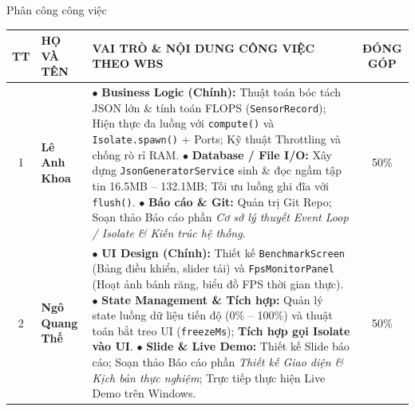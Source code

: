\documentclass[aspectratio=169, 10pt]{beamer}
\begin{document}
\begin{frame}{Phân công công việc}
  \vspace{-0.2cm}
  \centering
  \footnotesize
  \setlength{\tabcolsep}{4pt}
  \renewcommand{\arraystretch}{1.15}
  \begin{tabular}{|c|p{2.3cm}|p{8.5cm}|c|}
    \hline
    \rowcolor{TableHead}
    \color{white}\textbf{TT} & \centering\color{white}\textbf{HỌ VÀ TÊN} & \centering\color{white}\textbf{VAI TRÒ \& NỘI DUNG CÔNG VIỆC THEO WBS} & \color{white}\textbf{ĐÓNG GÓP} \\
    \hline
    \rowcolor{TableRowOdd}
    1 & \textbf{Lê Anh Khoa} & 
    $\bullet$ \textbf{Business Logic (Chính):} Thuật toán bóc tách JSON lớn \& tính toán FLOPS (\texttt{SensorRecord}); Hiện thực đa luồng với \texttt{compute()} và \texttt{Isolate.spawn()} + Ports; Kỹ thuật Throttling và chống rò rỉ RAM.\newline
    $\bullet$ \textbf{Database / File I/O:} Xây dựng \texttt{JsonGeneratorService} sinh \& đọc ngầm tập tin 16.5MB -- 132.1MB; Tối ưu luồng ghi đĩa với \texttt{flush()}.\newline
    $\bullet$ \textbf{Báo cáo \& Git:} Quản trị Git Repo; Soạn thảo Báo cáo phần \textit{Cơ sở lý thuyết Event Loop / Isolate \& Kiến trúc hệ thống}. & 50\% \\
    \hline
    \rowcolor{TableRowEven}
    2 & \textbf{Ngô Quang Thế} & 
    $\bullet$ \textbf{UI Design (Chính):} Thiết kế \texttt{BenchmarkScreen} (Bảng điều khiển, slider tải) và \texttt{FpsMonitorPanel} (Hoạt ảnh bánh răng, biểu đồ FPS thời gian thực).\newline
    $\bullet$ \textbf{State Management \& Tích hợp:} Quản lý state luồng dữ liệu tiến độ (0\% -- 100\%) và thuật toán bắt treo UI (\texttt{freezeMs}); \textbf{Tích hợp gọi Isolate vào UI}.\newline
    $\bullet$ \textbf{Slide \& Live Demo:} Thiết kế Slide báo cáo; Soạn thảo Báo cáo phần \textit{Thiết kế Giao diện \& Kịch bản thực nghiệm}; Trực tiếp thực hiện Live Demo trên Windows. & 50\% \\
    \hline
  \end{tabular}
\end{frame}
\end{document}
